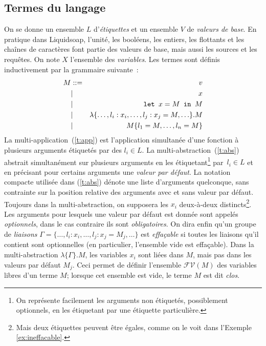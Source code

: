 \documentclass[twoside]{article}
\newcommand{\liquidsoap}{Liquidsoap}
\newcommand{\letin}[3]{\text{\texttt{let }} #1 = #2 \text{\texttt{ in }} #3}
\newcommand{\mabs}[2]{\lambda\{#1\}.#2}
\newcommand{\FV}[1]{\mathcal{FV}(#1)}
\theoremstyle{plain}
\theoremstyle{definition}
\theoremstyle{remark}
\begin{document}

\subsection{Termes du langage}
\label{section:termes}
On se donne un ensemble $L$ d'\emph{étiquettes} et un ensemble $V$ de
\emph{valeurs de base}. En pratique dans \liquidsoap{}, l'unité, les booléens,
les entiers, les flottants et les chaînes de caractères font partie des valeurs
de base, mais aussi les sources et les requêtes. On note $X$ l'ensemble des
\emph{variables}. Les termes sont définis inductivement par la grammaire
suivante~:
\begin{eqnarray}
  M &::=& v \label{t:val}\\
  &|& x \label{t:var}\\
  &|& \letin{x}{M}{M} \label{t:let} \\
  &|& \lambda \{\ldots, l_i:x_i, \ldots, l_j:x_j=M, \ldots\}.M \label{t:abs} \\
  &|& M\{l_1=M,\ldots,l_n=M\} \label{t:app}
\end{eqnarray}
La multi-application~(\ref{t:app}) est
l'application simultanée d'une fonction à plusieurs arguments
étiquetés par des $l_i\in L$.
La multi-abstraction~(\ref{t:abs}) abstrait simultanément sur plusieurs 
arguments en les étiquetant\footnote{
  On représente facilement les arguments non étiquetés, possiblement 
  optionnels, en les étiquetant par une étiquette particulière.}
par~$l_i\in L$ et en précisant pour certains arguments une 
\emph{valeur par défaut}.
La notation compacte utilisée dans (\ref{t:abs}) dénote une liste 
d'arguments quelconque, sans contrainte sur la position relative 
des arguments avec et sans valeur par défaut.
Toujours dans la multi-abstraction, on supposera
les $x_i$ deux-à-deux distincts\footnote{
  Mais deux étiquettes peuvent être égales, comme on le voit
  dans l'Exemple \ref{ex:ineffacable}.
}.
Les arguments pour lesquels une valeur par défaut est donnée sont appelés 
\emph{optionnels}, dans le cas contraire ils sont \emph{obligatoires}.
On dira enfin qu'un groupe de \emph{liaisons}
$\Gamma=\{\ldots, l_i:x_i, \ldots, l_j:x_j=M_j, \ldots\}$ est \emph{effaçable} si
toutes les liaisons qu'il contient sont optionnelles (en particulier, l'ensemble
vide est effaçable).
Dans la multi-abstraction $\mabs{\Gamma}{M}$,
les variables $x_i$ sont liées dans $M$,
mais pas dans les valeurs par défaut $M_j$.
Ceci permet de définir l'ensemble $\FV{M}$ des variables libres d'un terme $M$;
lorsque cet ensemble est vide, le terme $M$ est dit \emph{clos}.
\end{document}
